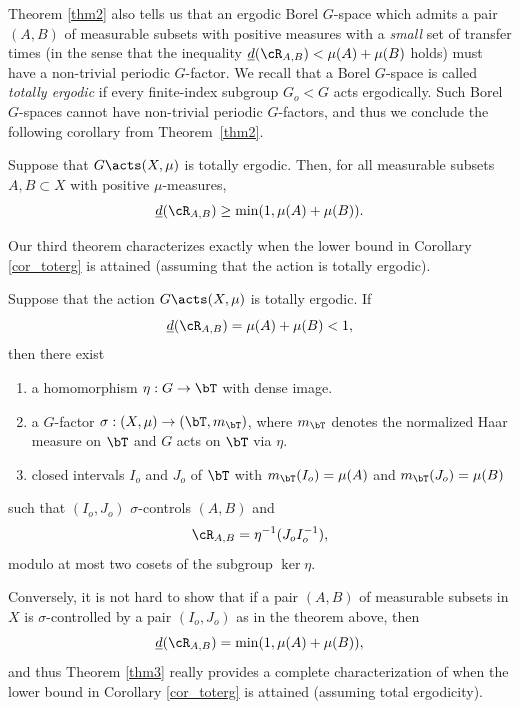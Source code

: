 Theorem \ref{thm2} also tells us that an ergodic Borel $G$-space which admits a pair $(A,B)$ of measurable subsets with positive measures with
a \emph{small} set of transfer times (in the sense that the inequality $\underline{d}(\cR_{A,B}) < \mu(A) + \mu(B)$ holds) must have a non-trivial periodic $G$-factor. We recall that a Borel $G$-space is called \emph{totally ergodic} if every finite-index subgroup $G_o < G$ acts ergodically. Such Borel $G$-spaces cannot have non-trivial periodic $G$-factors, and thus we conclude the following corollary from Theorem~\ref{thm2}.

\begin{corollary}
\label{cor_toterg}
Suppose that $G \acts (X,\mu)$ is totally ergodic. Then, for all measurable subsets $A, B \subset X$ with positive $\mu$-measures,
\[
\underline{d}(\cR_{A,B}) \geq \min(1,\mu(A) + \mu(B)).
\]
\end{corollary}

Our third theorem characterizes exactly when the lower bound in Corollary \ref{cor_toterg} is attained (assuming that the action is totally ergodic).

\begin{theorem}
\label{thm3}
Suppose that the action $G \acts (X,\mu)$ is totally ergodic. If
\[
\underline{d}(\cR_{A,B}) = \mu(A) + \mu(B) < 1,
\]
then there exist

\begin{enumerate}
\item
a homomorphism $\eta : G \to \bT$ with dense image.
\item
a $G$-factor $\sigma : (X,\mu) \to (\bT,m_{\bT})$, where $m_{\bT}$ denotes the normalized Haar measure on $\bT$
and $G$ acts on $\bT$ via $\eta$.
\item
closed intervals $I_o$ and $J_o$ of $\bT$ with $m_{\bT}(I_o) = \mu(A)$ and $m_{\bT}(J_o) = \mu(B)$
\end{enumerate}
such that $(I_o,J_o)$ $\sigma$-controls $(A,B)$ and
\[
\cR_{A,B} = \eta^{-1}(J_o I_o^{-1}),
\]
modulo at most two cosets of the subgroup $\ker \eta$.
\end{theorem}

\begin{remark}
Conversely, it is not hard to show that if a pair $(A,B)$ of measurable subsets in $X$ is $\sigma$-controlled by a pair $(I_o,J_o)$ as in the theorem above, then
\[
\underline{d}(\cR_{A,B}) = \min(1,\mu(A) + \mu(B)),
\]
and thus Theorem \ref{thm3} really provides a complete characterization of when the lower bound in Corollary \ref{cor_toterg} is attained (assuming total ergodicity).
\end{remark}

